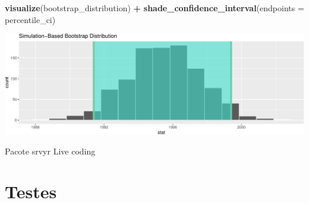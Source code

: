 \documentclass[
  9pt,
  ignorenonframetext,
  aspectratio=169]{beamer}
\newenvironment{Shaded}{\begin{snugshade}}{\end{snugshade}}
\newcommand{\DataTypeTok}[1]{\textcolor[rgb]{0.13,0.29,0.53}{#1}}
\newcommand{\KeywordTok}[1]{\textcolor[rgb]{0.13,0.29,0.53}{\textbf{#1}}}
\newcommand{\NormalTok}[1]{#1}
\newcommand{\OperatorTok}[1]{\textcolor[rgb]{0.81,0.36,0.00}{\textbf{#1}}}
\newcommand{\StringTok}[1]{\textcolor[rgb]{0.31,0.60,0.02}{#1}}
\begin{document}
\begin{frame}[fragile]{}
\protect\hypertarget{section-1}{}
\begin{Shaded}
\begin{Highlighting}[]
\KeywordTok{visualize}\NormalTok{(bootstrap\_distribution) }\OperatorTok{+}\StringTok{ }
\StringTok{  }\KeywordTok{shade\_confidence\_interval}\NormalTok{(}\DataTypeTok{endpoints =}\NormalTok{ percentile\_ci)}
\end{Highlighting}
\end{Shaded}

\includegraphics{aula_10_files/figure-beamer/unnamed-chunk-5-1.pdf}
\end{frame}

\begin{frame}{Pacote srvyr}
\protect\hypertarget{pacote-srvyr}{}
Live coding
\end{frame}

\hypertarget{testes}{%
\section{Testes}\label{testes}}
\end{document}
